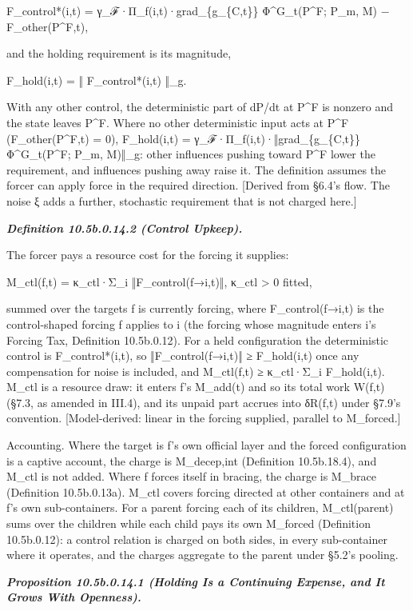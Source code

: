 \documentclass[
]{article}
\begin{document}
F\_control*(i,t) = γ\_ℱ·Π\_f(i,t)·grad\_\{g\_\{C,t\}\} Φ\^{}G\_t(P\^{}F;
P\_m, M) − F\_other(P\^{}F,t),

and the holding requirement is its magnitude,

F\_hold(i,t) = ‖ F\_control*(i,t) ‖\_g.

With any other control, the deterministic part of dP/dt at P\^{}F is
nonzero and the state leaves P\^{}F. Where no other deterministic input
acts at P\^{}F (F\_other(P\^{}F,t) = 0), F\_hold(i,t) =
γ\_ℱ·Π\_f(i,t)·‖grad\_\{g\_\{C,t\}\} Φ\^{}G\_t(P\^{}F; P\_m, M)‖\_g:
other influences pushing toward P\^{}F lower the requirement, and
influences pushing away raise it. The definition assumes the forcer can
apply force in the required direction. {[}Derived from §6.4's flow. The
noise ξ adds a further, stochastic requirement that is not charged
here.{]}

\emph{\textbf{Definition 10.5b.0.14.2 (Control Upkeep).}}

The forcer pays a resource cost for the forcing it supplies:

M\_ctl(f,t) = κ\_ctl·Σ\_i ‖F\_control(f→i,t)‖, κ\_ctl \textgreater{} 0
fitted,

summed over the targets f is currently forcing, where F\_control(f→i,t)
is the control-shaped forcing f applies to i (the forcing whose
magnitude enters i's Forcing Tax, Definition 10.5b.0.12). For a held
configuration the deterministic control is F\_control*(i,t), so
‖F\_control(f→i,t)‖ ≥ F\_hold(i,t) once any compensation for noise is
included, and M\_ctl(f,t) ≥ κ\_ctl·Σ\_i F\_hold(i,t). M\_ctl is a
resource draw: it enters f's M\_add(t) and so its total work W(f,t)
(§7.3, as amended in III.4), and its unpaid part accrues into δR(f,t)
under §7.9's convention. {[}Model-derived: linear in the forcing
supplied, parallel to M\_forced.{]}

Accounting. Where the target is f's own official layer and the forced
configuration is a captive account, the charge is M\_decep,int
(Definition 10.5b.18.4), and M\_ctl is not added. Where f forces itself
in bracing, the charge is M\_brace (Definition 10.5b.0.13a). M\_ctl
covers forcing directed at other containers and at f's own
sub-containers. For a parent forcing each of its children,
M\_ctl(parent) sums over the children while each child pays its own
M\_forced (Definition 10.5b.0.12): a control relation is charged on both
sides, in every sub-container where it operates, and the charges
aggregate to the parent under §5.2's pooling.

\emph{\textbf{Proposition 10.5b.0.14.1 (Holding Is a Continuing Expense,
and It Grows With Openness).}}
\end{document}
